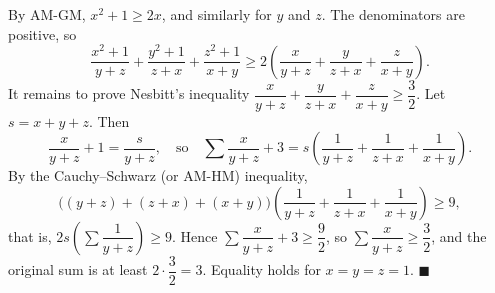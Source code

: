 By AM-GM, $x^2+1\ge2x$, and similarly for $y$ and $z$. The denominators are positive, so
\[
\dfrac{x^2+1}{y+z}+\dfrac{y^2+1}{z+x}+\dfrac{z^2+1}{x+y}\ge2\left(\dfrac{x}{y+z}+\dfrac{y}{z+x}+\dfrac{z}{x+y}\right).
\]
It remains to prove Nesbitt's inequality $\dfrac{x}{y+z}+\dfrac{y}{z+x}+\dfrac{z}{x+y}\ge\dfrac{3}{2}$. Let $s=x+y+z$. Then
\[
\dfrac{x}{y+z}+1=\dfrac{s}{y+z},\quad\text{so}\quad\sum\dfrac{x}{y+z}+3=s\left(\dfrac{1}{y+z}+\dfrac{1}{z+x}+\dfrac{1}{x+y}\right).
\]
By the Cauchy--Schwarz (or AM-HM) inequality,
\[
\bigl((y+z)+(z+x)+(x+y)\bigr)\left(\dfrac{1}{y+z}+\dfrac{1}{z+x}+\dfrac{1}{x+y}\right)\ge9,
\]
that is, $2s\left(\sum\dfrac{1}{y+z}\right)\ge9$. Hence $\sum\dfrac{x}{y+z}+3\ge\dfrac{9}{2}$, so $\sum\dfrac {x}{y+z}\ge\dfrac{3}{2}$, and the original sum is at least $2\cdot\dfrac{3}{2}=3$. Equality holds for $x=y=z=1$. $\blacksquare$
